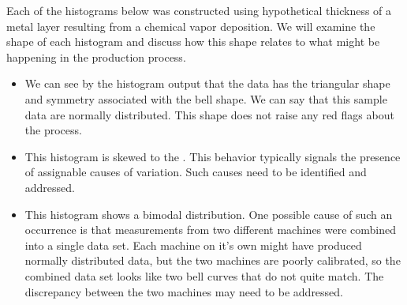 \documentclass{ximera}
\begin{document}
\begin{example}\label{ex:histogram1}


Each of the histograms below was constructed using hypothetical thickness of a metal layer resulting from a chemical vapor deposition.  We will examine the shape of each histogram and discuss how this shape relates to what might be happening in the production process.

\begin{itemize}
    \item We can see by the histogram output that the data has the triangular shape and symmetry associated with the bell shape. We can say that this sample data are normally distributed.  This shape does not raise any red flags about the process.

    \item This histogram is skewed to the .  This behavior typically signals the presence of assignable causes of variation.  Such causes need to be identified and addressed.

    \item This histogram shows a bimodal distribution.  One possible cause of such an occurrence is that measurements from two different machines were combined into a single data set.  Each machine on it's own might have produced normally distributed data, but the two machines are poorly calibrated, so the combined data set looks like two bell curves that do not quite match.  The discrepancy between the two machines may need to be addressed.
\end{itemize}





\end{example}
\end{document}
